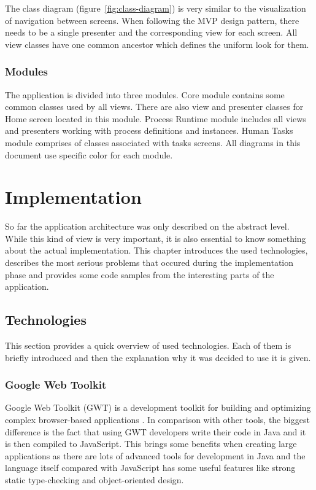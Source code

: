 \documentclass[12pt,oneside,final]{fithesis2}
\begin{document}
The class diagram (figure~\ref{fig:class-diagram}) is very similar to the visualization of navigation between screens.
When following the MVP design pattern, there needs to be a single presenter and the corresponding view for each screen.
All view classes have one common ancestor which defines the uniform look for them.

\subsection{Modules}
The application is divided into three modules.
Core module contains some common classes used by all views.
There are also view and presenter classes for Home screen located in this module.
Process Runtime module includes all views and presenters working with process definitions and instances.
Human Tasks module comprises of classes associated with tasks screens.
All diagrams in this document use specific color for each module.

\chapter{Implementation}
So far the application architecture was only described on the abstract level.
While this kind of view is very important, it is also essential to know something about the actual implementation.
This chapter introduces the used technologies, describes the most serious problems that occured during the implementation phase and provides some code samples from the interesting parts of the application.

\section{Technologies}
This section provides a quick overview of used technologies.
Each of them is briefly introduced and then the explanation why it was decided to use it is given.

\subsection{Google Web Toolkit}
Google Web Toolkit (GWT) is a development toolkit for building and optimizing complex browser-based applications \cite{gwtoverview}.
In comparison with other tools, the biggest difference is the fact that using GWT developers write their code in Java and it is then compiled to JavaScript.
This brings some benefits when creating large applications as there are lots of advanced tools for development in Java and the language itself compared with JavaScript has some useful features like strong static type-checking and object-oriented design.
\end{document}
